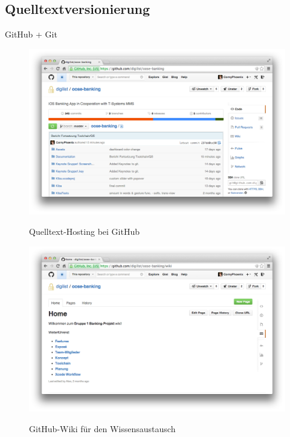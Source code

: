 \subsection{Quelltextversionierung}
GitHub + Git
\begin{figure}
	\centering
	\includegraphics[scale=.3]{Pictures/GitHubOverview}
	\label{fig:GitHubOverview}
	\caption{Quelltext-Hosting bei GitHub}
\end{figure}
\begin{figure}
	\centering
	\includegraphics[scale=.3]{Pictures/GitHubWiki}
	\label{fig:GitHubWiki}
	\caption{GitHub-Wiki für den Wissensaustausch}
\end{figure}
